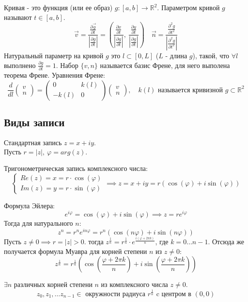 \begin{definition}
    Кривая - это функция (или ее образ) $g: [a, b] \to \mathbb{R}^2$. Параметром кривой $g$ называют $t \in [a, b]$. 
    \[\overrightarrow{v} = \frac{\frac{\partial \overrightarrow{g}}{\partial t}}{\left| \frac{\partial g}{\partial t}\right|} = \left( \frac{\frac{\partial x}{\partial t}}{\left| \frac{\partial g}{\partial t}\right|}, \ \frac{\frac{\partial y}{\partial t}}{\left| \frac{\partial g}{\partial t}\right|} \right) \quad \overrightarrow{n} = \frac{\frac{\partial^2 g}{\partial t^2}}{\left| \frac{\partial^2 g}{\partial t^2} \right|}\]
    Натуральный параметр на кривой $g$ это $l \subset [0, L]$ ($L$ - длина $g$), такой, что $\forall l$ выполнено $\frac{\partial g}{\partial l} = 1$.
    Набор $\{v, n\}$ называется базис Френе, для него выполена теорема Френе. 
    Уравнения Френе:
    \[
    \frac{d}{dl} \begin{pmatrix} v \\ n \end{pmatrix} = 
    \begin{pmatrix}
        0 & k(l) \\
        -k(l) & 0
    \end{pmatrix}
    \begin{pmatrix} v \\ n \end{pmatrix}, \quad k(l) \text{ называется кривизной } g \subset \mathbb{R}^2
    \]
\end{definition}

\subsection{Виды записи}
Стандартная запись $z = x + iy$. \\
Пусть $r = \left| z \right|, \ \varphi = arg(z)$.
\begin{definition}
    Тригонометрическая запись комплексного числа:
    \[\begin{cases}
        Re(z) = x = r\cdot \cos(\varphi) \\ 
        Im(z) = y = r\cdot \sin(\varphi)
    \end{cases} \implies z = x +iy = r(\cos(\varphi) + i\sin(\varphi))\]
\end{definition}
    
\begin{definition}
    Формула Эйлера:
    \[e^{i\varphi} = \cos(\varphi) + i\sin(\varphi) \implies z = re^{i\varphi}\]
    Тогда для натурального $n$:
    \[z^n = r^n e^{in\varphi} = r^n (\cos(n\varphi) + i\sin(n\varphi))\]
    Пусть $z \neq 0 \implies r = \left| z \right| > 0$. тогда $z^{\frac{1}{n}} = r^{\frac{1}{n}}\cdot e^{\frac{i(\varphi + 2\pi k)}{n}}$, где $k = 0 \hdots n-1$.
    Отсюда же получается формула Муавра для корней степени $n$ из $z \neq 0$:
    \[z^{\frac{1}{n}} = r^{\frac{1}{n}}(\cos(\frac{\varphi + 2\pi k}{n})+ i\sin(\frac{\varphi + 2\pi k}{n}))\]
\end{definition}

\begin{note}
    $\exists n$ различных корней степени $n$ из комплексного числа $z \neq 0$.
    \[z_0, z_1, \hdots z_{n-1} \in \text{ окружности радиуса } r^{\frac{1}{n}} \text{ c центром в } (0,0)\]
\end{note}
